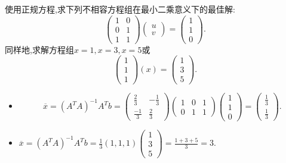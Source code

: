 ﻿\documentclass{book} \usepackage{exsheets} \usepackage{xeCJK}
\begin{document}
\begin{question}
  使用正规方程,求下列不相容方程组在最小二乘意义下的最佳解:
$$
\begin{pmatrix}
  1&0\\
  0&1\\
  1&1
\end{pmatrix}
\begin{pmatrix}
  u\\
  v
\end{pmatrix}=
\begin{pmatrix}
  1\\
  1\\
  0
\end{pmatrix}.
$$同样地,求解方程组$x=1,x=3,x=5$或
$$
\begin{pmatrix}
  1\\
  1\\
  1
\end{pmatrix}(x)=
\begin{pmatrix}
  1\\
  3\\
  5
\end{pmatrix}.
$$
\end{question}
\begin{solution}
  \begin{itemize}
  \item
$$
\overline{x}=(A^TA)^{-1}A^Tb=
\begin{pmatrix}
  \frac{2}{3}&-\frac{1}{3}\\
  \frac{-1}{3}&\frac{2}{3}
\end{pmatrix}
\begin{pmatrix}
  1&0&1\\
  0&1&1
\end{pmatrix}
\begin{pmatrix}
  1\\
  1\\
  0
\end{pmatrix}=
\begin{pmatrix}
  \frac{1}{3}\\
  \frac{1}{3}
\end{pmatrix}.
$$
\item $\overline{x}=(A^TA)^{-1}A^Tb=\frac{1}{3}(1,1,1)
  \begin{pmatrix}
    1\\
    3\\
    5
  \end{pmatrix}=\frac{1+3+5}{3}=3.  $
\end{itemize}
\end{solution}
\end{document}

